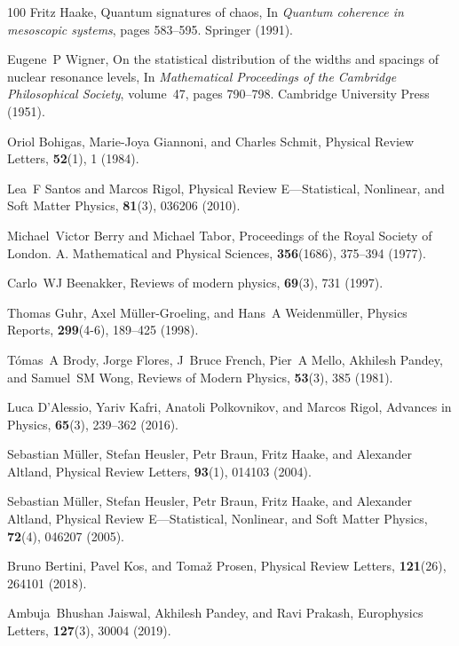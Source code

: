 \documentclass[preprint,pteplogo]{ptephy_v2}%
\numberwithin{equation}{section}
\theoremstyle{definition}
\begin{document}
\begin{thebibliography}{100}
Fritz Haake,
\newblock Quantum signatures of chaos,
\newblock In {\em Quantum coherence in mesoscopic systems}, pages 583--595. Springer (1991).

Eugene~P Wigner,
\newblock On the statistical distribution of the widths and spacings of nuclear resonance levels,
\newblock In {\em Mathematical Proceedings of the Cambridge Philosophical Society}, volume~47, pages 790--798. Cambridge University Press (1951).

Oriol Bohigas, Marie-Joya Giannoni, and Charles Schmit, Physical Review Letters, {\bf 52}(1), 1 (1984).

Lea~F Santos and Marcos Rigol, Physical Review E—Statistical, Nonlinear, and Soft Matter Physics, {\bf 81}(3), 036206 (2010).

Michael~Victor Berry and Michael Tabor, Proceedings of the Royal Society of London. A. Mathematical and Physical Sciences, {\bf 356}(1686), 375--394 (1977).

Carlo~WJ Beenakker, Reviews of modern physics, {\bf 69}(3), 731 (1997).

Thomas Guhr, Axel M{\"u}ller-Groeling, and Hans~A Weidenm{\"u}ller, Physics Reports, {\bf 299}(4-6), 189--425 (1998).

T{\'o}mas~A Brody, Jorge Flores, J~Bruce French, Pier~A Mello, Akhilesh Pandey, and Samuel~SM Wong, Reviews of Modern Physics, {\bf 53}(3), 385 (1981).

Luca D'Alessio, Yariv Kafri, Anatoli Polkovnikov, and Marcos Rigol, Advances in Physics, {\bf 65}(3), 239--362 (2016).

Sebastian M{\"u}ller, Stefan Heusler, Petr Braun, Fritz Haake, and Alexander Altland, Physical Review Letters, {\bf 93}(1), 014103 (2004).

Sebastian M{\"u}ller, Stefan Heusler, Petr Braun, Fritz Haake, and Alexander Altland, Physical Review E—Statistical, Nonlinear, and Soft Matter Physics, {\bf 72}(4), 046207 (2005).

Bruno Bertini, Pavel Kos, and Toma{\v{z}} Prosen, Physical Review Letters, {\bf 121}(26), 264101 (2018).

Ambuja~Bhushan Jaiswal, Akhilesh Pandey, and Ravi Prakash, Europhysics Letters, {\bf 127}(3), 30004 (2019).


\end{thebibliography}
\end{document}
